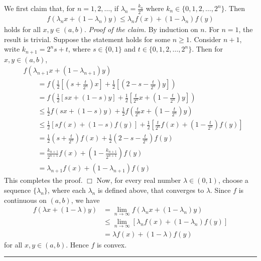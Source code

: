 \documentclass[12pt]{article}
\theoremstyle{definition}
\begin{document}
We first claim that, for $n=1,2,\ldots$, if $\lambda_n=\frac{k_n}{2^n}$ where $k_n\in\{0,1,2,\ldots,2^n\}$. Then
\begin{align*}
f(\lambda_nx+(1-\lambda_n)y)
\le\lambda_nf(x)+(1-\lambda_n)f(y)
\end{align*}
holds for all $x,y\in(a,b)$.
\textit{Proof of the claim.} By induction on $n$. For $n=1$, the result is trivial. Suppose the statement holds for some $n\ge 1$. Consider $n+1$, write $k_{n+1}=2^ns+t$, where $s\in\{0,1\}$ and $t\in\{0,1,2,\ldots,2^n\}$. Then for $x,y\in(a,b)$,
\begin{align*}
&f\left(\lambda_{n+1}x+\left(1-\lambda_{n+1}\right)y\right) \\
&\qquad=f\left(\frac{1}{2}\left[\left(s+\frac{t}{2^n}\right)x\right]
+\frac{1}{2}\left[\left(2-s-\frac{t}{2^n}\right)y\right]\right) \\
&\qquad=f\left(\frac{1}{2}\left[sx+\left(1-s\right)y\right]
+\frac{1}{2}\left[\frac{t}{2^n}x+\left(1-\frac{t}{2^n}\right)y\right]\right) \\
&\qquad\le\frac{1}{2}f\left(sx+\left(1-s\right)y\right)
+\frac{1}{2}f\left(\frac{t}{2^n}x+\left(1-\frac{t}{2^n}\right)y\right) \\
&\qquad\le\frac{1}{2}\left[sf(x)+(1-s)f(y)\right]
+\frac{1}{2}\left[\frac{t}{2^n}f(x)+\left(1-\frac{t}{2^n}\right)f(y)\right] \\
&\qquad=\frac{1}{2}\left(s+\frac{t}{2^n}\right)f(x)
+\frac{1}{2}\left(2-s-\frac{t}{2^n}\right)f(y) \\
&\qquad=\frac{k_{n+1}}{2^{n+1}}f(x)+\left(1-\frac{k_{n+1}}{2^{n+1}}\right)f(y) \\
&\qquad=\lambda_{n+1}f(x)+\left(1-\lambda_{n+1}\right)f(y)
\end{align*}
This completes the proof. $\Box$
Now, for every real number $\lambda\in(0,1)$, choose a sequence $\{\lambda_n\}$, where each $\lambda_n$ is defined above, that converges to $\lambda$. Since $f$ is continuous on $(a,b)$, we have
\begin{align*}
f(\lambda x+(1-\lambda)y)
&=\lim_{n\to\infty}f\left(\lambda_nx+\left(1-\lambda_n\right)y\right) \\
&\le\lim_{n\to\infty}\left[\lambda_nf(x)+\left(1-\lambda_n\right)f(y)\right] \\
&=\lambda f(x)+(1-\lambda)f(y)
\end{align*}
for all $x,y\in(a,b)$. Hence $f$ is convex.



\bigskip\noindent\hrule\bigskip
\end{document}
